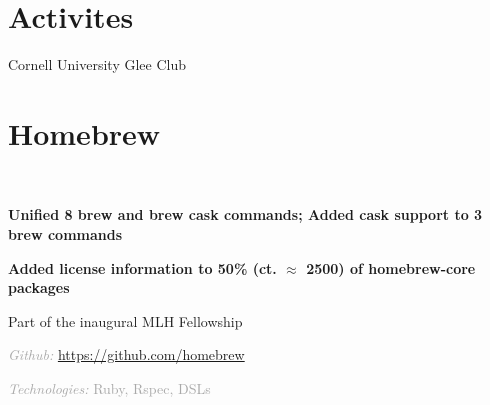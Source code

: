 \documentclass[]{deedy-resume-openfont}
\newcommand{\myurl}[1]{
	\urlstyle{same}\url{#1}
}
\let\sectionold\section
\renewcommand{\section}[1]{
	\sectionold{\textcolor{sectiontitlecolor}{#1}}
}
\begin{document}
\begin{minipage}[t]{0.33\textwidth}
\section{Activites}
Cornell University Glee Club


%
%

\end{minipage} 
\hfill
\begin{minipage}[t]{0.66\textwidth} 



\section{Homebrew}  \\
\vspace{\topsep} %
\begin{tightemize}
\item \textbf{Unified 8 brew and brew cask commands; Added cask support to 3 brew commands}
\item \textbf{Added license information to 50\% (ct. $\approx$ 2500) of homebrew-core packages}
\item Part of the inaugural MLH Fellowship
\item \textcolor{darkgray}{\textit{Github:} \myurl{https://github.com/homebrew}}
\item \textcolor{darkgray}{\textit{Technologies:} Ruby, Rspec, DSLs}
\end{tightemize}


\end{minipage}
\end{document}

